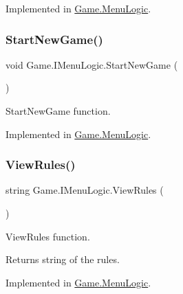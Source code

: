 Implemented in \mbox{\hyperlink{class_game_1_1_menu_logic_a01964f3a56734ce48d1e74ce3d47f246}{Game.\+Menu\+Logic}}.

\mbox{\label{interface_game_1_1_i_menu_logic_a1336eac89b3be808d5fc174b3a972f70}} 
\subsubsection{\texorpdfstring{StartNewGame()}{StartNewGame()}}
{\footnotesize\ttfamily void Game.\+I\+Menu\+Logic.\+Start\+New\+Game (\begin{DoxyParamCaption}{ }\end{DoxyParamCaption})}



Start\+New\+Game function. 



Implemented in \mbox{\hyperlink{class_game_1_1_menu_logic_ae5471adcbafc9b50c4e2405dfa4c8688}{Game.\+Menu\+Logic}}.

\mbox{\label{interface_game_1_1_i_menu_logic_a4d6129e2d747d4d6047e9d26d8996ac2}} 
\subsubsection{\texorpdfstring{ViewRules()}{ViewRules()}}
{\footnotesize\ttfamily string Game.\+I\+Menu\+Logic.\+View\+Rules (\begin{DoxyParamCaption}{ }\end{DoxyParamCaption})}



View\+Rules function. 

\begin{DoxyReturn}{Returns}
string of the rules.
\end{DoxyReturn}


Implemented in \mbox{\hyperlink{class_game_1_1_menu_logic_a55ba09f791d6e1b2e510178d52ea3e50}{Game.\+Menu\+Logic}}.

\mbox{\label{interface_game_1_1_i_menu_logic_a4abce1542884de119ff7f241979106ee}} 
